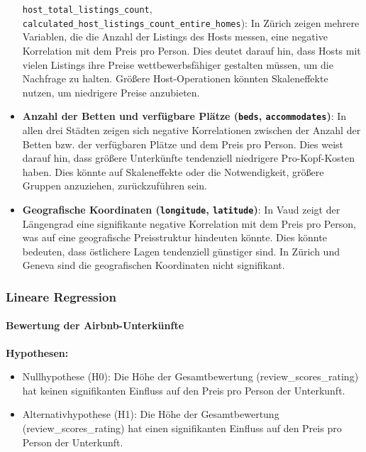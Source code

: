 \documentclass[
  journal,
]{IEEEtran}%
\let\oldparagraph\paragraph
\renewcommand{\paragraph}[1]{\oldparagraph{#1}\mbox{}}
\providecommand{\tightlist}{%
  \setlength{\itemsep}{0pt}\setlength{\parskip}{0pt}}\usepackage{longtable,booktabs,array}
\begin{document}
\begin{itemize}
{  \texttt{host\_total\_listings\_count},
  \texttt{calculated\_host\_listings\_count\_entire\_homes})}: In Zürich
  zeigen mehrere Variablen, die die Anzahl der Listings des Hosts
  messen, eine negative Korrelation mit dem Preis pro Person. Dies
  deutet darauf hin, dass Hosts mit vielen Listings ihre Preise
  wettbewerbsfähiger gestalten müssen, um die Nachfrage zu halten.
  Größere Host-Operationen könnten Skaleneffekte nutzen, um niedrigere
  Preise anzubieten.
\item
  \textbf{Anzahl der Betten und verfügbare Plätze (\texttt{beds},
  \texttt{accommodates})}: In allen drei Städten zeigen sich negative
  Korrelationen zwischen der Anzahl der Betten bzw. der verfügbaren
  Plätze und dem Preis pro Person. Dies weist darauf hin, dass größere
  Unterkünfte tendenziell niedrigere Pro-Kopf-Kosten haben. Dies könnte
  auf Skaleneffekte oder die Notwendigkeit, größere Gruppen anzuziehen,
  zurückzuführen sein.
\item
  \textbf{Geografische Koordinaten (\texttt{longitude},
  \texttt{latitude})}: In Vaud zeigt der Längengrad eine signifikante
  negative Korrelation mit dem Preis pro Person, was auf eine
  geografische Preisstruktur hindeuten könnte. Dies könnte bedeuten,
  dass östlichere Lagen tendenziell günstiger sind. In Zürich und Geneva
  sind die geografischen Koordinaten nicht signifikant.
\end{itemize}

\hypertarget{lineare-regression-1}{%
\subsubsection{\texorpdfstring{\textbf{Lineare
Regression}}{Lineare Regression}}\label{lineare-regression-1}}

\hypertarget{bewertung-der-airbnb-unterkuxfcnfte}{%
\paragraph{Bewertung der
Airbnb-Unterkünfte}\label{bewertung-der-airbnb-unterkuxfcnfte}}

\textbf{Hypothesen:}

\begin{itemize}
\tightlist
\item
  Nullhypothese (H0): Die Höhe der Gesamtbewertung
  (review\_scores\_rating) hat keinen signifikanten Einfluss auf den
  Preis pro Person der Unterkunft.
\item
  Alternativhypothese (H1): Die Höhe der Gesamtbewertung
  (review\_scores\_rating) hat einen signifikanten Einfluss auf den
  Preis pro Person der Unterkunft.
\end{itemize}
\end{document}
